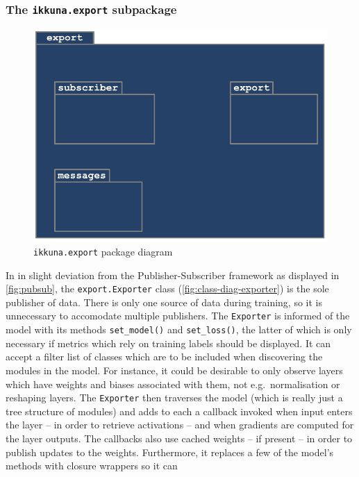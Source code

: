 \subsubsection*{The \texttt{ikkuna.export} subpackage}

\begin{figure}
    \hypertarget{fig:pack-diag-export}{%
        \centering
        \includegraphics[max width=.7\textwidth]{gfx/diagrams/class_diagrams/export_package_diagram.pdf}
        \caption{\texttt{ikkuna.export} package diagram}\label{fig:pack-diag-export}
    }
\end{figure}

In in slight deviation from the Publisher-Subscriber framework as displayed in
\cref{fig:pubsub}, the \texttt{export.Exporter} class
(\cref{fig:class-diag-exporter}) is the sole publisher of data. There is only one
source of data during training, so it is unnecessary to accomodate multiple
publishers. The \texttt{Exporter} is informed of the model with its methods
\lstinline{set_model()} and \lstinline{set_loss()}, the latter of which is only
necessary if metrics which rely on training labels should be displayed.  It can
accept a filter list of classes which are to be included when discovering the
modules in the model. For instance, it could be desirable to only observe layers
which have weights and biases associated with them, not e.g.~normalisation or
reshaping layers. The \texttt{Exporter} then traverses the model (which is
really just a tree structure of modules) and adds to each a callback invoked
when input enters the layer -- in order to retrieve activations -- and when
gradients are computed for the layer outputs. The callbacks also use cached
weights -- if present -- in order to publish updates to the weights.
Furthermore, it replaces a few of the model's methods with closure wrappers so
it can

